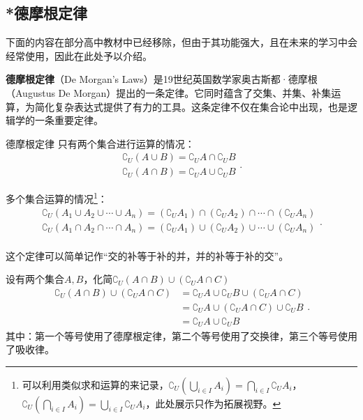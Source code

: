 \subsection{*德摩根定律}\label{sub_HsSeOp_1}

下面的内容在部分高中教材中已经移除，但由于其功能强大，且在未来的学习中会经常使用，因此在此处予以介绍。

\textbf{德摩根定律}（De Morgan’s Laws）是19世纪英国数学家奥古斯都·德摩根（Augustus De Morgan）提出的一条定律。它同时蕴含了交集、并集、补集运算，为简化复杂表达式提供了有力的工具。这条定律不仅在集合论中出现，也是逻辑学的一条重要定律。

\begin{theorem}{德摩根定律}
只有两个集合进行运算的情况：
\begin{equation}
\begin{array}{c} 
\complement_U(A \cup B) = \complement_U A \cap \complement_U B \\  
\complement_U(A \cap B) = \complement_U A \cup \complement_U B
\end{array}.~
\end{equation}

多个集合运算的情况\footnote{可以利用类似求和运算的来记录，$\displaystyle\complement_U(\bigcup_{i\in I} A_i)=\bigcap_{i\in I} {\complement_UA_i}$，$\displaystyle\complement_U(\bigcap_{i\in I} A_i)=\bigcup_{i\in I} {\complement_UA_i}$，此处展示只作为拓展视野。}：
\begin{equation}
\begin{array}{c} 
\displaystyle
\complement_U(A_1\cup A_2\cup\cdots\cup A_n)=(\complement_UA_1)\cap (\complement_UA_2)\cap\cdots\cap(\complement_UA_n)\\  
\displaystyle
\complement_U(A_1\cap A_2\cap\cdots\cap A_n)=(\complement_UA_1)\cup (\complement_UA_2)\cup\cdots\cup(\complement_UA_n)\\  
\end{array}.~
\end{equation}
\end{theorem}

这个定律可以简单记作“交的补等于补的并，并的补等于补的交”。

\begin{example}{设有两个集合$A,B$，化简$\complement_U(A \cap B)\cup (\complement_UA \cap C)$}
$$
\begin{align*} 
\complement_U(A \cap B)\cup (\complement_UA \cap C) &= \complement_UA \cup \complement_UB\cup (\complement_UA \cap C) \\ 
&= \complement_UA\cup (\complement_UA \cap C)  \cup \complement_UB\\ 
&=\complement_UA\cup \complement_UB
\end{align*}.~
$$
其中：第一个等号使用了德摩根定律，第二个等号使用了交换律，第三个等号使用了吸收律。
\end{example}

